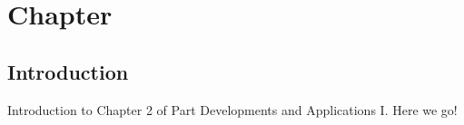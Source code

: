 \chapter{Chapter}
\label{sect::devs01_chapter2}

\section{Introduction}
\label{sect::devs01_chapter2_intro}

Introduction to Chapter 2 of Part Developments and Applications I. Here we go!